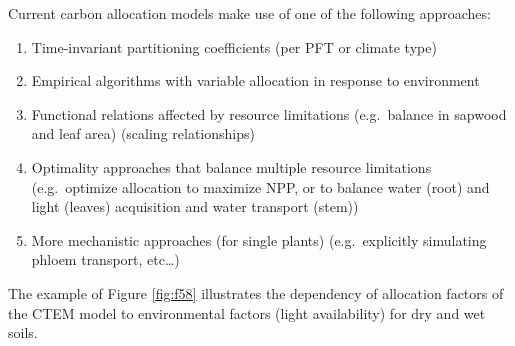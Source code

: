 \documentclass[12pt,oneside]{book}
\providecommand{\tightlist}{%
  \setlength{\itemsep}{0pt}\setlength{\parskip}{0pt}}
\begin{document}
Current carbon allocation models make use of one of the following
approaches:

\begin{enumerate}
\def\labelenumi{\arabic{enumi}.}
\tightlist
\item
  Time-invariant partitioning coefficients (per PFT or climate type)
\item
  Empirical algorithms with variable allocation in response to
  environment
\item
  Functional relations affected by resource limitations (e.g.~balance in
  sapwood and leaf area) (scaling relationships)
\item
  Optimality approaches that balance multiple resource limitations
  (e.g.~optimize allocation to maximize NPP, or to balance water (root)
  and light (leaves) acquisition and water transport (stem))
\item
  More mechanistic approaches (for single plants) (e.g.~explicitly
  simulating phloem transport, etc\ldots{})
\end{enumerate}

The example of Figure \ref{fig:f58} illustrates the dependency of
allocation factors of the CTEM model to environmental factors (light
availability) for dry and wet soils.
\end{document}
